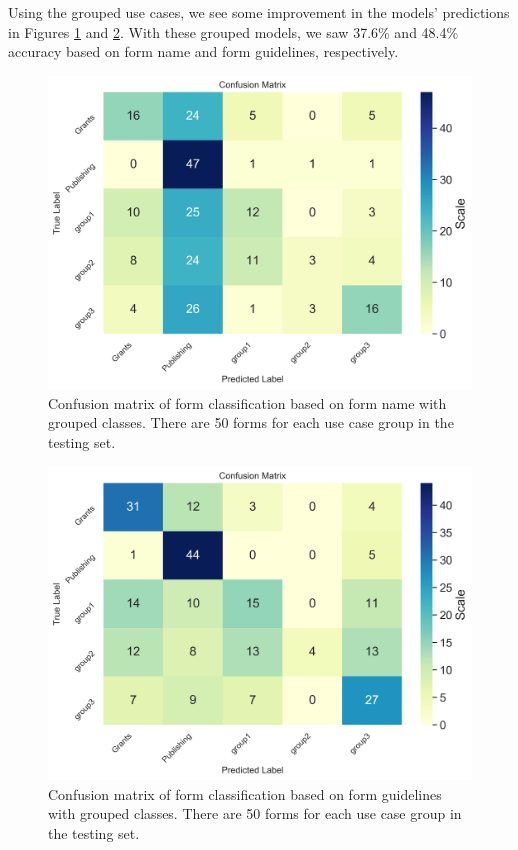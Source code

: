 \documentclass{article}
\begin{document}
Using the grouped use cases, we see some improvement in the models' predictions in Figures \ref{fig:newNameConfusion} and \ref{fig:newDescConfusion}. With these grouped models, we saw 37.6\% and 48.4\% accuracy based on form name and form guidelines, respectively.

\begin{figure}[h!]
    \centering
    \includegraphics[width=.8\textwidth]{newNameConfusion.png}
    \caption{Confusion matrix of form classification based on form name with grouped classes. There are 50 forms for each use case group in the testing set.}
    \label{fig:newNameConfusion}
\end{figure}

\begin{figure}[h!]
    \centering
    \includegraphics[width=.8\textwidth]{newDescConfusion.png}
    \caption{Confusion matrix of form classification based on form guidelines with grouped classes. There are 50 forms for each use case group in the testing set.}
    \label{fig:newDescConfusion}
\end{figure}
\end{document}
